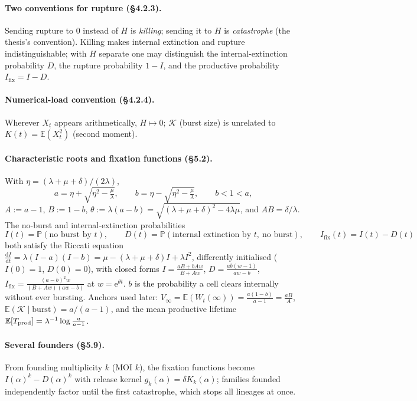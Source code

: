 \documentclass[11pt,a4paper]{report}
\newcommand{\pr}[1]{\mathbb{P}\!\left(#1\right)}
\newcommand{\ex}[1]{\mathbb{E}\!\left(#1\right)}
\newcommand{\mean}[1]{\mathbb{E}\!\left[#1\right]}
\newcommand{\dd}{\mathrm{d}}
\newcommand{\ee}{\mathrm{e}}
\newcommand{\ddt}[1]{\frac{\dd #1}{\dd t}}
\newcommand{\Ifix}{I_{\mathrm{fix}}}
\newcommand{\Kb}{\mathcal{K}}
\newcommand{\Xt}{X_t}
\newcommand{\Wt}{W_t}
\theoremstyle{definition}
\begin{document}
\paragraph{Two conventions for rupture (\S4.2.3).} Sending rupture to $0$
instead of $H$ is \emph{killing}; sending it to $H$ is \emph{catastrophe}
(the thesis's convention). Killing makes internal extinction and rupture
indistinguishable; with $H$ separate one may distinguish the
internal-extinction probability $D$, the rupture probability $1-I$, and the
productive probability $\Ifix=I-D$.

\paragraph{Numerical-load convention (\S4.2.4).} Wherever $\Xt$ appears
arithmetically, $H\mapsto 0$; $\Kb$ (burst size) is unrelated to
$K(t)=\ex{\Xt^2}$ (second moment).

\paragraph{Characteristic roots and fixation functions (\S5.2).} With
$\eta=(\lambda+\mu+\delta)/(2\lambda)$,
\begin{equation}
a=\eta+\sqrt{\eta^2-\tfrac{\mu}{\lambda}},
\qquad
b=\eta-\sqrt{\eta^2-\tfrac{\mu}{\lambda}},
\qquad
b<1<a,
\end{equation}
$A:=a-1$, $B:=1-b$, $\theta:=\lambda(a-b)
=\sqrt{(\lambda+\mu+\delta)^2-4\lambda\mu}$, and $AB=\delta/\lambda$.
The no-burst and internal-extinction probabilities
\begin{equation}
I(t)=\pr{\text{no burst by }t},
\qquad
D(t)=\pr{\text{internal extinction by }t,\ \text{no burst}},
\qquad
\Ifix(t)=I(t)-D(t)
\end{equation}
both satisfy the Riccati equation
$\ddt{I}=\lambda(I-a)(I-b)=\mu-(\lambda+\mu+\delta)I+\lambda I^2$,
differently initialised ($I(0)=1$, $D(0)=0$), with closed forms
$I=\frac{aB+bAw}{B+Aw}$, $D=\frac{ab(w-1)}{aw-b}$,
$\Ifix=\frac{(a-b)^2w}{(B+Aw)(aw-b)}$ at $w=\ee^{\theta t}$.
$b$ is the probability a cell clears internally without ever bursting.
Anchors used later: $V_\infty=\ex{\Wt(\infty)}=\frac{a(1-b)}{a-1}=\frac{aB}{A}$,
$\ex{\Kb\mid\text{burst}}=a/(a-1)$, and the mean productive lifetime
$\mean{T_{\rm prod}}=\lambda^{-1}\log\frac{a}{a-1}$.

\paragraph{Several founders (\S5.9).} From founding multiplicity $k$ (MOI
$k$), the fixation functions become $I(\alpha)^k-D(\alpha)^k$ with release
kernel $g_k(\alpha)=\delta K_k(\alpha)$; families founded independently
factor until the first catastrophe, which stops all lineages at once.
\end{document}

